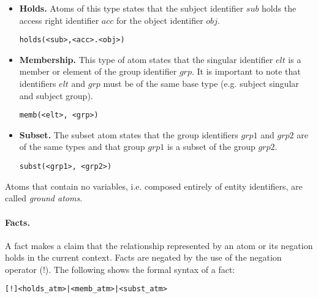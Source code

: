 \documentclass{llncs}
\begin{document}
          \begin{itemize}
            \item
              {\bf Holds.} Atoms of this type states that the subject
              identifier $sub$ holds the access right identifier $acc$ for the
              object identifier $obj$.

              \begin{verbatim}holds(<sub>,<acc>.<obj>)\end{verbatim}

            \vspace{1mm}
            \item
              {\bf Membership.} This type of atom states that the singular
              identifier $elt$ is a member or element of the group identifier
              $grp$. It is important to note that identifiers $elt$ and $grp$
              must be of the same base type (e.g. subject singular and subject
              group).

              \begin{verbatim}memb(<elt>, <grp>)\end{verbatim}

            \vspace{1mm}
            \item
              {\bf Subset.} The subset atom states that the group identifiers
              $grp1$ and $grp2$ are of the same types and that group $grp1$ is
              a subset of the group $grp2$.

              \begin{verbatim}subst(<grp1>, <grp2>)\end{verbatim}
          \end{itemize}

          Atoms that contain no variables, i.e. composed entirely of entity
          identifiers, are called {\em ground atoms}.

        \paragraph{\bf Facts.}

          A fact makes a claim that the relationship represented by an atom or
          its negation holds in the current context. Facts are negated by the
          use of the negation operator ($!$). The following shows the formal
          syntax of a fact:

          \begin{verbatim}[!]<holds_atm>|<memb_atm>|<subst_atm>\end{verbatim}
\end{document}
